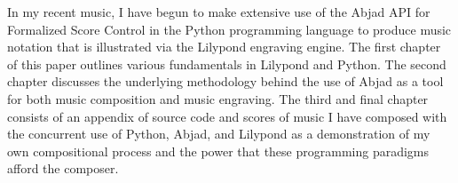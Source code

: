 
In my recent music, I have begun to make extensive use of the Abjad API for Formalized Score Control in the Python programming language to produce music notation that is illustrated via the Lilypond engraving engine. The first chapter of this paper outlines various fundamentals in Lilypond and Python. The second chapter discusses the underlying methodology behind the use of Abjad as a tool for both music composition and music engraving. The third and final chapter consists of an appendix of source code and scores of music I have composed with the concurrent use of Python, Abjad, and Lilypond as a demonstration of my own compositional process and the power that these programming paradigms afford the composer.